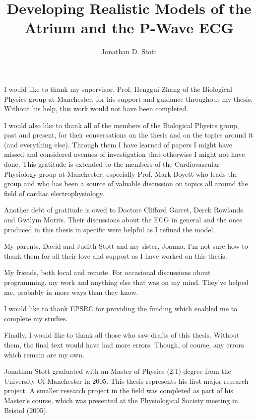 \documentclass[12pt,PhD]{muthesis}
\begin{document}
    \title{Developing Realistic Models of the Atrium and the P-Wave ECG}
    \author{Jonathan D. Stott}

    \beforeabstract
    \singlespace
    
    \onehalfspace
    \afterabstract
I would like to thank my supervisor, Prof. Henggui Zhang of the Biological Physics
group at Manchester, for his support and guidance throughout my thesis.
Without his help, this work would not have been completed.

I would also like to thank all of the members of the Biological Physics group,
past and present, for their conversations on the thesis and on the topics around
it (and everything else).
Through them I have learned of papers I might have missed and considered avenues
of investigation that otherwise I might not have done.
This gratitude is extended to the members of the Cardiovascular Physiology
group at Manchester, especially Prof. Mark Boyett who leads the group and who
has been a source of valuable discussion on topics all around the field of
cardiac electrophysiology.

Another debt of gratitude is owed to Doctors Clifford Garret, Derek Rowlands and
Gwilym Morris.
Their discussions about the ECG in general and the ones produced in this thesis
in specific were helpful as I refined the model.

My parents, David and Judith Stott and my sister, Joanna.
I'm not sure how to thank them for all their love and support as I have worked
on this thesis.

My friends, both local and remote.
For occasional discussions about programming, my work and anything else that was
on my mind.
They've helped me, probably in more ways than they know.

I would like to thank EPSRC for providing the funding which enabled me to
complete my studies.

Finally, I would like to thank all those who saw drafts of this thesis.
Without them, the final text would have had more errors.
Though, of course, any errors  which remain are my own.


Jonathan Stott graduated with an Master of Physics (2:1) degree from the
University Of Manchester in 2005.
This thesis represents his first major research project.
A smaller research project in the field was completed as part of his Master's
course, which was presented at the Physiological Society meeting in Bristol
(2005).


    \afterpreface
    

   
   
   
   
   
   

%    
    
\end{document}
